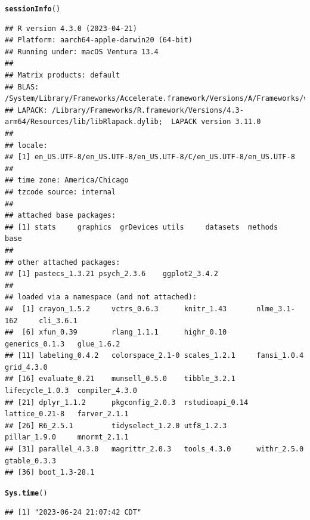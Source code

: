 \documentclass{article}\usepackage[]{graphicx}\usepackage[]{xcolor}
\makeatletter
\newcommand{\hlstd}[1]{\textcolor[rgb]{0.345,0.345,0.345}{#1}}%
\newcommand{\hlkwd}[1]{\textcolor[rgb]{0.737,0.353,0.396}{\textbf{#1}}}%
\newenvironment{kframe}{%
 \def\at@end@of@kframe{}%
 \ifinner\ifhmode%
  \def\at@end@of@kframe{\end{minipage}}%
  \begin{minipage}{\columnwidth}%
 \fi\fi%
 \def\FrameCommand##1{\hskip\@totalleftmargin \hskip-\fboxsep
 \colorbox{shadecolor}{##1}\hskip-\fboxsep
     \hskip-\linewidth \hskip-\@totalleftmargin \hskip\columnwidth}%
 \MakeFramed {\advance\hsize-\width
   \@totalleftmargin\z@ \linewidth\hsize
   \@setminipage}}%
 {\par\unskip\endMakeFramed%
 \at@end@of@kframe}
\newenvironment{knitrout}{}{} %
\makeatother
\begin{document}
\begin{knitrout}
\color{fgcolor}\begin{kframe}
\begin{alltt}
\hlkwd{sessionInfo}\hlstd{()}
\end{alltt}
\begin{verbatim}
## R version 4.3.0 (2023-04-21)
## Platform: aarch64-apple-darwin20 (64-bit)
## Running under: macOS Ventura 13.4
## 
## Matrix products: default
## BLAS:   /System/Library/Frameworks/Accelerate.framework/Versions/A/Frameworks/vecLib.framework/Versions/A/libBLAS.dylib 
## LAPACK: /Library/Frameworks/R.framework/Versions/4.3-arm64/Resources/lib/libRlapack.dylib;  LAPACK version 3.11.0
## 
## locale:
## [1] en_US.UTF-8/en_US.UTF-8/en_US.UTF-8/C/en_US.UTF-8/en_US.UTF-8
## 
## time zone: America/Chicago
## tzcode source: internal
## 
## attached base packages:
## [1] stats     graphics  grDevices utils     datasets  methods   base     
## 
## other attached packages:
## [1] pastecs_1.3.21 psych_2.3.6    ggplot2_3.4.2 
## 
## loaded via a namespace (and not attached):
##  [1] crayon_1.5.2     vctrs_0.6.3      knitr_1.43       nlme_3.1-162     cli_3.6.1       
##  [6] xfun_0.39        rlang_1.1.1      highr_0.10       generics_0.1.3   glue_1.6.2      
## [11] labeling_0.4.2   colorspace_2.1-0 scales_1.2.1     fansi_1.0.4      grid_4.3.0      
## [16] evaluate_0.21    munsell_0.5.0    tibble_3.2.1     lifecycle_1.0.3  compiler_4.3.0  
## [21] dplyr_1.1.2      pkgconfig_2.0.3  rstudioapi_0.14  lattice_0.21-8   farver_2.1.1    
## [26] R6_2.5.1         tidyselect_1.2.0 utf8_1.2.3       pillar_1.9.0     mnormt_2.1.1    
## [31] parallel_4.3.0   magrittr_2.0.3   tools_4.3.0      withr_2.5.0      gtable_0.3.3    
## [36] boot_1.3-28.1
\end{verbatim}
\begin{alltt}
\hlkwd{Sys.time}\hlstd{()}
\end{alltt}
\begin{verbatim}
## [1] "2023-06-24 21:07:42 CDT"
\end{verbatim}
\end{kframe}
\end{knitrout}
\end{document}
